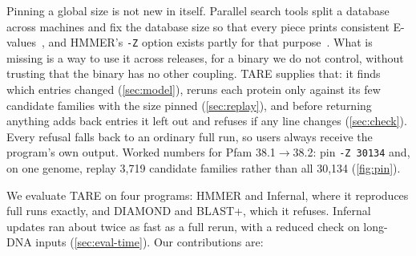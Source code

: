 \documentclass[letterpaper,twocolumn,10pt]{article}
\theoremstyle{definition}
\newcommand{\sys}{TARE\xspace}
\newcommand{\sys}{PARE\xspace}
\begin{document}
Pinning a global size is not new in itself. Parallel search tools split a database across machines and fix the
database size so that every piece prints consistent E-values~\cite{darling2003mpiblast}, and HMMER's \texttt{-Z} option
exists partly for that purpose~\cite{eddy2011hmmer}. What is missing is a way to use it across releases, for a binary we
do not control, without trusting that the binary has no other coupling. \sys supplies that: it finds which entries
changed (\cref{sec:model}), reruns each protein only against its few candidate families with the size pinned
(\cref{sec:replay}), and before returning anything adds back entries it left out and refuses if any line changes
(\cref{sec:check}). Every refusal falls back to an ordinary full run, so users always receive the program's own output.
Worked numbers for Pfam 38.1$\rightarrow$38.2: pin \texttt{-Z 30134} and, on one genome, replay 3{,}719 candidate families rather than all 30{,}134 (\cref{fig:pin}).

We evaluate \sys on four programs: HMMER and Infernal, where it reproduces full runs exactly, and DIAMOND and BLAST+,
which it refuses. Infernal updates ran about twice as fast as a full rerun, with a reduced check on long\nobreakdash-DNA inputs
(\cref{sec:eval-time}). Our contributions are:
\end{document}
